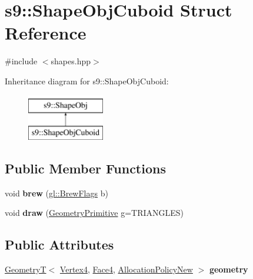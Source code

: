 \hypertarget{structs9_1_1ShapeObjCuboid}{\section{s9\-:\-:\-Shape\-Obj\-Cuboid \-Struct \-Reference}
\label{structs9_1_1ShapeObjCuboid}
}


{\ttfamily \#include $<$shapes.\-hpp$>$}

\-Inheritance diagram for s9\-:\-:\-Shape\-Obj\-Cuboid\-:\begin{figure}[H]
\begin{center}
\leavevmode
\includegraphics[height=2.000000cm]{structs9_1_1ShapeObjCuboid}
\end{center}
\end{figure}
\subsection*{\-Public \-Member \-Functions}
\begin{DoxyCompactItemize}
\item 
\hypertarget{structs9_1_1ShapeObjCuboid_a69b663f6e00bed55efa5863b86f6a5f9}{void {\bfseries brew} (\hyperlink{structs9_1_1gl_1_1BrewFlags}{gl\-::\-Brew\-Flags} b)}\label{structs9_1_1ShapeObjCuboid_a69b663f6e00bed55efa5863b86f6a5f9}

\item 
\hypertarget{structs9_1_1ShapeObjCuboid_a85f82e721e5fd48270da15adbd66c93c}{void {\bfseries draw} (\hyperlink{namespaces9_ad57d1332f8fd67d23f6a1d3520ab785c}{\-Geometry\-Primitive} g=\-T\-R\-I\-A\-N\-G\-L\-E\-S)}\label{structs9_1_1ShapeObjCuboid_a85f82e721e5fd48270da15adbd66c93c}

\end{DoxyCompactItemize}
\subsection*{\-Public \-Attributes}
\begin{DoxyCompactItemize}
\item 
\hypertarget{structs9_1_1ShapeObjCuboid_af475e3bceaba7566b8d7614e9218bad4}{\hyperlink{classs9_1_1GeometryT}{\-Geometry\-T}$<$ \hyperlink{structs9_1_1VertexT}{\-Vertex4}, \hyperlink{structs9_1_1FaceT}{\-Face4}, \*
\hyperlink{classs9_1_1AllocationPolicyNew}{\-Allocation\-Policy\-New} $>$ {\bfseries geometry}}\label{structs9_1_1ShapeObjCuboid_af475e3bceaba7566b8d7614e9218bad4}

\end{DoxyCompactItemize}


